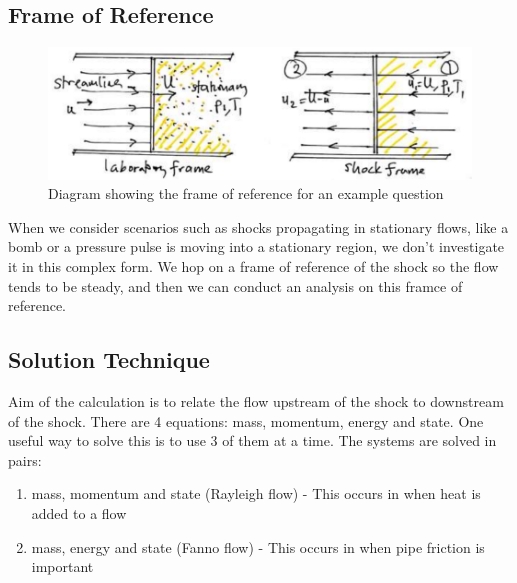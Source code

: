 \documentclass[class=report, crop=false, 12pt,a4paper]{standalone}
\begin{document}
\subsection{Frame of Reference}
\begin{figure}[H]
    \centering
    \includegraphics[width = 0.9 \textwidth]{../img/diagram5.PNG} 
    \caption{Diagram showing the frame of reference for an example question}
\end{figure}
When we consider scenarios such as shocks propagating in stationary flows, like a bomb or a pressure pulse is moving into a stationary region, we don't investigate it in this complex form. 
We hop on a frame of reference of the shock so the flow tends to be steady, and then we can conduct an analysis on this framce of reference. 
\subsection{Solution Technique}
Aim of the calculation is to relate the flow upstream of the shock to downstream of the shock. 
There are 4 equations: mass, momentum, energy and state. 
One useful way to solve this is to use 3 of them at a time. 
The systems are solved in pairs: 
\begin{enumerate}[label=(\alph*), noitemsep]
    \item mass, momentum and state (Rayleigh flow) - This occurs in when heat is added to a flow 
    \item mass, energy and state (Fanno flow) - This occurs in when pipe friction is important
\end{enumerate}
\end{document}
